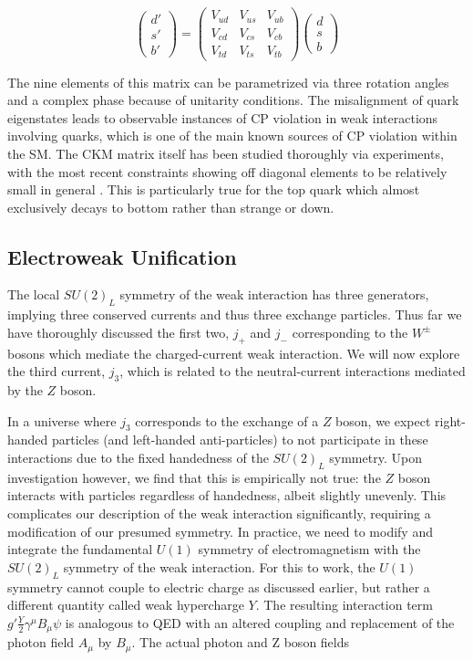 \begin{equation}
\begin{pmatrix} d'  \\ s' \\ b' \end{pmatrix} =
\begin{pmatrix} V_{ud} & V_{us} & V_{ub} \\ V_{cd} & V_{cs} & V_{cb} \\ V_{td} & V_{ts} & V_{tb} \end{pmatrix}
\begin{pmatrix} d \\ s \\ b \end{pmatrix}
\end{equation}

The nine elements of this matrix can be parametrized via three rotation angles and a complex phase because of 
unitarity conditions. The misalignment of quark eigenstates leads to observable instances of CP violation in weak 
interactions involving quarks, which is one of the main known sources of CP violation within the SM. The 
CKM matrix itself has been studied thoroughly via experiments, with the most recent constraints showing off diagonal 
elements to be relatively small in general \cite{pdg-2024-review}. This is particularly true for the top quark which 
almost exclusively decays to bottom rather than strange or down.

\subsection{Electroweak Unification}

The local $SU(2)_L$ symmetry of the weak interaction has three generators, implying three conserved currents and 
thus three exchange particles. Thus far we have thoroughly discussed the first two,  $j_+$ and $j_-$ corresponding 
to the $W^{\pm}$ bosons which mediate the charged-current weak interaction. We will now explore the third current, 
$j_3$, which is related to the neutral-current interactions mediated by the $Z$ boson.  \par

In a universe where $j_3$ corresponds to the exchange of a $Z$ boson, we expect right-handed particles (and 
left-handed anti-particles) to not participate in these interactions due to the fixed handedness of the $SU(2)_L$ 
symmetry. Upon investigation however, we find that this is empirically not true: the $Z$ boson interacts with particles 
regardless of handedness, albeit slightly unevenly. This complicates our description of the weak interaction significantly, 
requiring a modification of our presumed symmetry. In practice, we need to modify and integrate the fundamental 
$U(1)$ symmetry of electromagnetism with the $SU(2)_L$ symmetry of the weak interaction. For this to work, the 
$U(1)$ symmetry cannot couple to electric charge as discussed earlier, but rather a different quantity called weak 
hypercharge $Y$. The resulting interaction term $g'\frac{Y}{2}\gamma^{\mu}B_{\mu}\psi$ is analogous to QED with 
an altered coupling and replacement of the photon field $A_{\mu}$ by $B_{\mu}$. The actual photon and Z boson 
fields

